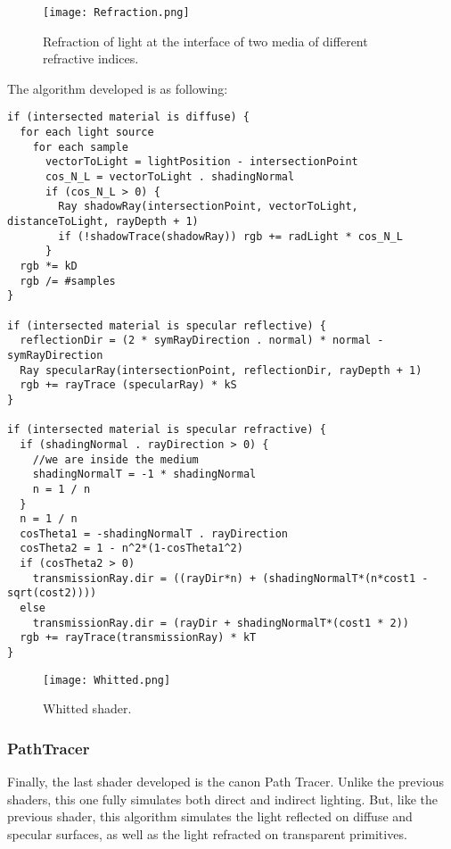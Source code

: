 \begin{figure}[H]
	\centering
	\caption{Refraction of light at the interface of two media of different refractive indices.}
	\label{Refraction.}
	\texttt{[image: Refraction.png]}
\end{figure}

\par
The algorithm developed is as following:

\begin{lstlisting}
if (intersected material is diffuse) {
  for each light source
    for each sample
      vectorToLight = lightPosition - intersectionPoint
      cos_N_L = vectorToLight . shadingNormal
      if (cos_N_L > 0) {
        Ray shadowRay(intersectionPoint, vectorToLight, distanceToLight, rayDepth + 1)
        if (!shadowTrace(shadowRay)) rgb += radLight * cos_N_L
      }
  rgb *= kD
  rgb /= #samples
}

if (intersected material is specular reflective) {
  reflectionDir = (2 * symRayDirection . normal) * normal - symRayDirection
  Ray specularRay(intersectionPoint, reflectionDir, rayDepth + 1)
  rgb += rayTrace (specularRay) * kS
}

if (intersected material is specular refractive) {
  if (shadingNormal . rayDirection > 0) {
    //we are inside the medium
    shadingNormalT = -1 * shadingNormal
    n = 1 / n
  }
  n = 1 / n
  cosTheta1 = -shadingNormalT . rayDirection
  cosTheta2 = 1 - n^2*(1-cosTheta1^2)
  if (cosTheta2 > 0)
    transmissionRay.dir = ((rayDir*n) + (shadingNormalT*(n*cost1 - sqrt(cost2))))
  else
    transmissionRay.dir = (rayDir + shadingNormalT*(cost1 * 2))
  rgb += rayTrace(transmissionRay) * kT
}
\end{lstlisting}

\begin{figure}[H]
	\centering
	\caption{Whitted shader.}
	\label{Whitted shader.}
	\texttt{[image: Whitted.png]}
\end{figure}


\subsubsection{PathTracer}

\par
Finally, the last shader developed is the canon Path Tracer.
Unlike the previous shaders, this one fully simulates both direct and indirect lighting.
But, like the previous shader, this algorithm simulates the light reflected on diffuse and specular surfaces, as well as the light refracted on transparent primitives.

